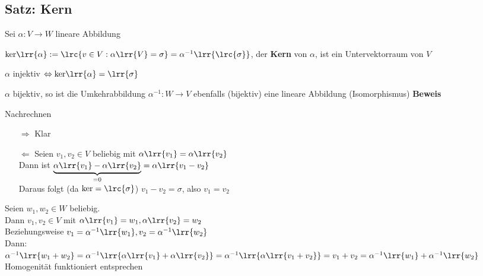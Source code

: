 \subsection{Satz: Kern}
	Sei $\alpha:V\rightarrow W$ lineare Abbildung
		\item $\mbox{ker}\lrr{\alpha}:=\lrc{v\in V:\alpha\lrr{V}=\sigma}=\alpha^{-1}\lrr{\lrc{\sigma}}$, der \textbf{Kern} von $\alpha$, ist ein Untervektorraum von $V$
		\item $\alpha$ injektiv $\Leftrightarrow\mbox{ker}\lrr{\alpha}=\lrr{\sigma}$
		\item $\alpha$ bijektiv, so ist die Umkehrabbildung $\alpha^{-1}:W\rightarrow V$ ebenfalls (bijektiv) eine lineare Abbildung (Isomorphismus)
	\subExEnd
	\textbf{Beweis}
		\item Nachrechnen
		\item
			\begin{enumerate}
				\item[$\Rightarrow$] Klar
				\item[$\Leftarrow$] Seien $v_1,v_2\in V$ beliebig mit $\alpha\lrr{v_1}=\alpha\lrr{v_2}$\\
					Dann ist $\underbrace{\alpha\lrr{v_1}-\alpha\lrr{v_2}}_{\scriptstyle =0}=\alpha\lrr{v_1-v_2}$\\
					Daraus folgt (da $\mbox{ker}=\lrc{\sigma}$) $v_1-v_2=\sigma$, also $v_1=v_2$
			\end{enumerate}
		\item Seien $w_1,w_2\in W$ beliebig.\\
			Dann $v_1,v_2\in V$ mit $\alpha\lrr{v_1}=w_1,\alpha\lrr{v_2}=w_2$\\
			Beziehungsweise $v_1=\alpha^{-1}\lrr{w_1}, v_2=\alpha^{-1}\lrr{w_2}$\\
			Dann:\\
			$\alpha^{-1}\lrr{w_1+w_2}=\alpha^{-1}\lrr{\alpha\lrr{v_1}+\alpha\lrr{v_2}}=\alpha^{-1}\lrr{\alpha\lrr{v_1+v_2}}=v_1+v_2=
			\alpha^{-1}\lrr{w_1}+\alpha^{-1}\lrr{w_2}$\\
			Homogenität funktioniert entsprechen
	\subExEnd

